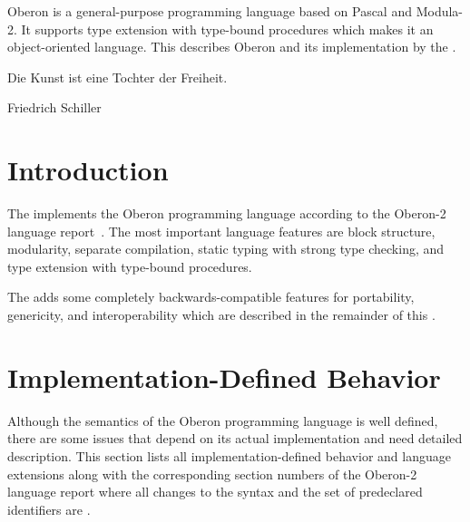 




\renewcommand{\seeoberon}{}

{Oberon is a general-purpose programming language based on Pascal and Modula-2.
It supports type extension with type-bound procedures which makes it an object-oriented language.
This \documentation{} describes Oberon and its implementation by the \ecs{}.}

\epigraph{Die Kunst ist eine Tochter der Freiheit.}{Friedrich Schiller}

\section{Introduction}

The \ecs{} implements the Oberon programming language according to the Oberon-2 language report~\cite{moessenboeck1996}.
The most important language features are block structure, modularity, separate compilation, static typing with strong type checking, and type extension with type-bound procedures.

\begin{center}\oblogo{4em}\end{center}

The \ecs{} adds some completely backwards-compatible features for portability, genericity, and interoperability which are described in the remainder of this \documentation{}.

\section{Implementation-Defined Behavior}

Although the semantics of the Oberon programming language is well defined, there are some issues that depend on its actual implementation and need detailed description.
This section lists all implementation-defined behavior and language extensions along with the corresponding section numbers of the Oberon-2 language report where all changes to the syntax and the set of predeclared identifiers are .

